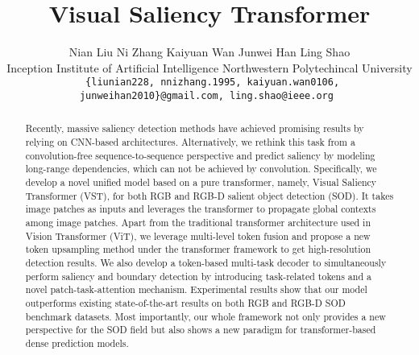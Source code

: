\documentclass[10pt,twocolumn,letterpaper]{article}
\begin{document}
\title{Visual Saliency Transformer}

\author{
	Nian Liu\footnotemark[1]
	\hspace{25pt}
	Ni Zhang\footnotemark[1]
	\hspace{25pt}
	Kaiyuan Wan
	\hspace{25pt}
	Junwei Han\footnotemark[2]
	\hspace{25pt}
	Ling Shao
	\hspace{25pt}
	\\
	Inception Institute of Artificial Intelligence
	\hspace{8pt}
	Northwestern Polytechincal University
	\\
	{\tt\small
    \{liunian228, nnizhang.1995, kaiyuan.wan0106, junweihan2010\}@gmail.com, ling.shao@ieee.org
    }
}

\maketitle
{}  

\ificcvfinal\thispagestyle{empty}\fi

\begin{abstract}
Recently, massive saliency detection methods have achieved promising results by relying on CNN-based architectures. Alternatively, we rethink this task from a convolution-free sequence-to-sequence perspective and predict saliency by modeling long-range dependencies, which can not be achieved by convolution.
    Specifically, we develop a novel unified model based on a pure transformer, namely, Visual Saliency Transformer (VST), for both RGB and RGB-D salient object detection (SOD). It takes image patches as inputs and leverages the transformer to propagate global contexts among image patches. Apart from the traditional transformer architecture used in Vision Transformer (ViT), we leverage multi-level token fusion and propose a new token upsampling method under the transformer framework to get high-resolution detection results. We also develop a token-based multi-task decoder to simultaneously perform saliency and boundary detection by introducing task-related tokens and a novel patch-task-attention mechanism.
Experimental results show that our model outperforms existing state-of-the-art results on both RGB and RGB-D SOD benchmark datasets. Most importantly, our whole framework not only provides a new perspective for the SOD field but also shows a new paradigm for transformer-based dense prediction models.

\end{abstract}
\end{document}
